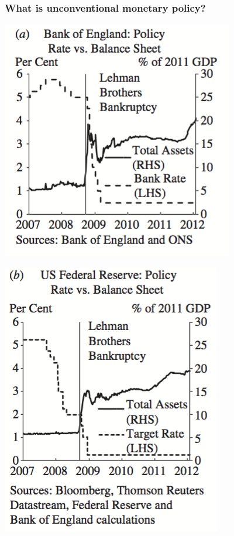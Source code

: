 \documentclass[11pt]{beamer}
\begin{document}
\begin{frame}
	\frametitle{What is unconventional monetary policy?}
	\begin{minipage}{0.33\textwidth}
    	\includegraphics[width=\textwidth]{Figures/BoE_UnconvMonPol.png}
    \end{minipage}\begin{minipage}{0.33\textwidth}
    	\includegraphics[width=\textwidth]{Figures/Fed_UnconvMonPol.png}

\end{minipage}
\end{frame}
\end{document}
